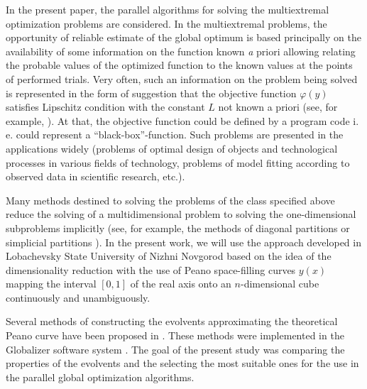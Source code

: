 \documentclass[runningheads]{llncs}
\begin{document}
In the present paper, the parallel algorithms for solving the multiextremal optimization problems
are considered. In the multiextremal problems, the opportunity of reliable estimate of the global
optimum is based principally on the availability of some information on the function known
{\textit a priori} allowing relating the probable values of the optimized function to the known
values at the points of performed trials. Very often, such an information on the problem being
solved is represented in the form of suggestion that the objective function $\varphi(y)$ satisfies
Lipschitz condition with the constant $L$ not known a priori (see, for example,
\cite{Jones,Gablonsky,Evtushenko}). At that, the objective function could be defined by a
program code i. e. could represent a ``black-box''-function. Such problems are presented in the
applications widely (problems of optimal design of objects and technological processes in
various fields of technology, problems of model fitting according to observed data in scientific
research, etc.).

Many methods destined to solving the problems of the class specified above reduce the solving
of a multidimensional problem to solving the one-dimensional subproblems implicitly (see, for
example, the methods of diagonal partitions \cite{Sergeyev2006,SergeyevKvasov2015} or
simplicial partitions \cite{Zilinskas2008,Zilinskas2014}). In the present work, we will use the
approach developed in Lobachevsky State University of Nizhni Novgorod based on the idea of
the dimensionality reduction with the use of Peano space-filling curves $y(x)$ mapping the
interval $[0,1]$ of the real axis onto an $n$-dimensional cube continuously and unambiguously.

Several methods of constructing the evolvents approximating the theoretical Peano curve have
been proposed in \cite{strongin1978,Strongin1992,Goryachih2017,Gergel2009}. These
methods were implemented in the Globalizer software system \cite{globalizerSystem}. The goal
of the present study was comparing the properties of the evolvents and the selecting the most
suitable ones for the use in the parallel global optimization algorithms.

\end{document}
